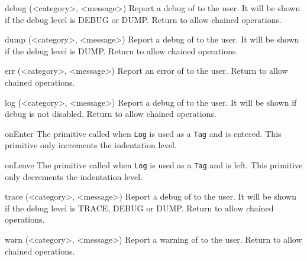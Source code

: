 \begin{urbiscriptapi}

\item[debug](<category>, <message>)%
  Report a debug  of  to the user. It will be
  shown if the debug level is DEBUG or DUMP. Return \this to allow chained
  operations.

\item[dump](<category>, <message>)%
  Report a debug  of  to the user. It will be
  shown if the debug level is DUMP. Return \this to allow chained
  operations.

\item[err](<category>, <message>)%
  Report an error  of  to the user. Return \this
  to allow chained operations.

\item[log](<category>, <message>)%
  Report a debug  of  to the user. It will be
  shown if debug is not disabled. Return \this to allow chained operations.

\item[onEnter]%
  The primitive called when \lstinline|Log| is used as a \lstinline|Tag| and
  is entered. This primitive only increments the indentation level.

\item[onLeave]%
  The primitive called when \lstinline|Log| is used as a \lstinline|Tag| and
  is left. This primitive only decrements the indentation level.

\item[trace](<category>, <message>)%
  Report a debug  of  to the user. It will be
  shown if the debug level is TRACE, DEBUG or DUMP. Return \this to allow
  chained operations.

\item[warn](<category>, <message>)%
  Report a warning  of  to the user. Return \this
  to allow chained operations.

\end{urbiscriptapi}


